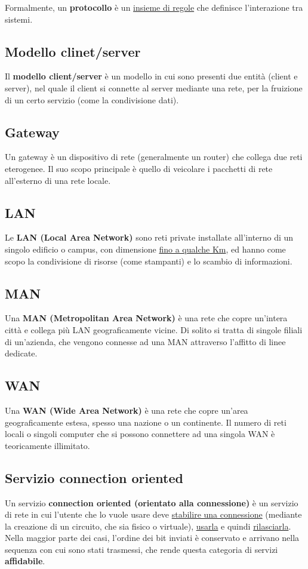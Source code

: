         Formalmente, un \textbf{protocollo} è un \underline{insieme di regole} che definisce l’interazione tra sistemi.

    \subsection{Modello clinet/server}
        Il \textbf{modello client/server} è un modello in cui sono presenti due entità (client e server), nel
        quale il client si connette al server mediante una rete, per la fruizione di un certo servizio (come
        la condivisione dati).

    \subsection{Gateway}
        Un gateway è un dispositivo di rete (generalmente un router) che collega due reti eterogenee.
        Il suo scopo principale è quello di veicolare i pacchetti di rete all’esterno di una rete locale.

    \subsection{LAN}
        Le \textbf{LAN (Local Area Network)} sono reti private installate all’interno di un singolo edificio o
        campus, con dimensione \underline{fino a qualche Km}, ed hanno come scopo la condivisione di risorse
        (come stampanti) e lo scambio di informazioni.

    \subsection{MAN}
        Una \textbf{MAN (Metropolitan Area Network)} è una rete che copre un’intera città e collega più LAN
        geograficamente vicine. Di solito si tratta di singole filiali di un’azienda, che vengono connesse
        ad una MAN attraverso l’affitto di linee dedicate.

    \subsection{WAN}
        Una \textbf{WAN (Wide Area Network)} è una rete che copre un’area geograficamente estesa, spesso
        una nazione o un continente. Il numero di reti locali o singoli computer che si possono
        connettere ad una singola WAN è teoricamente illimitato.

    \subsection{Servizio connection oriented}
        Un servizio \textbf{connection oriented (orientato alla connessione)} è un servizio di rete in cui
        l’utente che lo vuole usare deve \underline{stabilire una connessione} (mediante la creazione di un circuito,
        che sia fisico o virtuale), \underline{usarla} e quindi \underline{rilasciarla}. Nella maggior parte dei casi, l’ordine dei bit
        inviati è conservato e arrivano nella sequenza con cui sono stati trasmessi, che rende questa
        categoria di servizi \textbf{affidabile}.\\

